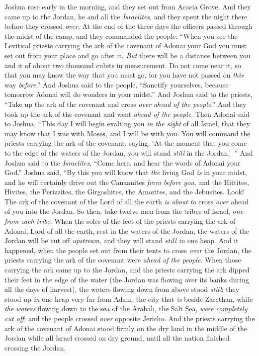 \begin{biblechapter} %
 Joshua rose early in the morning, and they set out from Acacia Grove. And they came up to the Jordan, he and all the \textit{Israelites}, and they spent the night there before they crossed \textit{over}.
\verse At the end of the three days the officers passed through the midst of the camp,
\verse and they commanded the people: “When you see the Levitical priests carrying the ark of the covenant of Adonai your God you must set out from your place and go after it.
\verse \textit{But} there will be a distance between you and it of about two thousand cubits in measurement. Do not come near it, so that you may know the way that you must go, for you have not passed on \textit{this} way \textit{before}.”
\verse And Joshua said to the people, “Sanctify yourselves, because tomorrow Adonai will do wonders in your midst.”
\verse And Joshua said to the priests, “Take up the ark of the covenant and cross \textit{over} \textit{ahead of the people}.” And they took up the ark of the covenant and went \textit{ahead of the people}.
\verse Then Adonai said to Joshua, “This day I will begin exalting you \textit{in the sight} of all Israel, that they may know that I was with Moses, and I will be with you.
\verse You will command the priests carrying the ark of the covenant, saying, ‘At the moment that you come to the edge of the waters of the Jordan, you will stand \textit{still} in the Jordan.’ ”
\verse And Joshua said to the \textit{Israelites}, “Come here, and hear the words of Adonai your God.”
\verse Joshua said, “By this you will know that \textit{the} living God \textit{is} in your midst, and he will certainly drive out the Canaanites \textit{from before you}, and the Hittites, Hivites, the Perizzites, the Girgashites, the Amorites, and the Jebusites.
\verse Look! The ark of the covenant of the Lord of all the earth \textit{is about to} cross \textit{over} ahead of you into the Jordan.
\verse So then, take twelve men from the tribes of Israel, \textit{one from each tribe}.
\verse When the soles of the feet of the priests carrying the ark of Adonai, Lord of all the earth, rest in the waters of the Jordan, the waters of the Jordan will be cut off \textit{upstream}, and they will stand \textit{still in} one heap.
\verse And it happened, when the people set out from their tents to cross \textit{over} the Jordan, the priests carrying the ark of the covenant were \textit{ahead of the people}.
\verse When those carrying the ark came up to the Jordan, and the priests carrying the ark dipped their feet in the edge of the water (the Jordan was flowing over its banks during all the days of harvest),
\verse the waters flowing down from above stood \textit{still}; they stood up \textit{in} one heap very far from Adam, the city that \textit{is} beside Zarethan, while \textit{the waters} flowing down to the sea of the Arabah, the Salt Sea, \textit{were completely cut off}; and the people crossed \textit{over} opposite Jericho.
\verse And the priests carrying the ark of the covenant of Adonai stood firmly on the dry land in the middle of the Jordan while all Israel crossed on dry ground, until all the nation finished crossing the Jordan.
\end{biblechapter}

